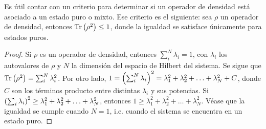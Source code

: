 Es útil contar con un criterio para determinar si un operador de densidad 
está asociado a un estado puro o mixto. Ese criterio es el siguiente:
sea $\rho$ un operador de densidad, entonces
$\Tr \qty(\rho^2)\leq 1$, donde la igualdad se satisface únicamente
para estados puros.

\begin{proof}
	Si $\rho$ es un operador de densidad, entonces $\sum_i^N \lambda_i=1$, 
	con $\lambda_i$ los autovalores de $\rho$ y $N$ la dimensión 
	del espacio de Hilbert del sistema. Se sigue que 
	$\Tr \qty(\rho^2) = \sum_i^N \lambda_i^2$. Por otro lado, 
	$1=\qty(\sum_i^N \lambda_i)^2=\lambda_1^2+\lambda_2^2+\ldots+\lambda_N^2+C$,
	donde $C$ son los términos producto entre distintas $\lambda_i$ y sus
	potencias. Si 
	$\qty(\sum_i \lambda_i)^2\geq\lambda_1^2+\lambda_2^2+\ldots+\lambda_N^2$,
	entonces
	$1\geq\lambda_1^2+\lambda_2^2+\ldots+\lambda_N^2$. Véase que 
	la igualdad se cumple cuando $N=1$, i.e. cuando el sistema 
	se encuentra en un estado puro. 
\end{proof}

